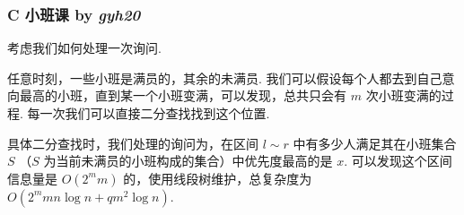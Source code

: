 \frame
{
  \frametitle{C 小班课 by \itshape gyh20}

 	考虑我们如何处理一次询问. \pause

	任意时刻，一些小班是满员的，其余的未满员. 我们可以假设每个人都去到自己意向最高的小班，直到某一个小班变满，可以发现，总共只会有 $m$ 次小班变满的过程. 每一次我们可以直接二分查找找到这个位置. \pause

	具体二分查找时，我们处理的询问为，在区间 $l\sim r$ 中有多少人满足其在小班集合 $S$ （$S$ 为当前未满员的小班构成的集合）中优先度最高的是 $x$. 可以发现这个区间信息量是 $O(2^m m)$ 的，使用线段树维护，总复杂度为 $O(2^m m n\log n+qm^2\log n)$.

}
